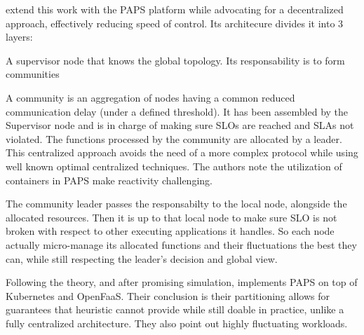 \documentclass[11pt]{sdm}
\begin{document}
\begin{description}
	\citet{baresi_paps_2019, baresi_paps_2021} extend this work with the \gls{PAPS} platform while advocating for a decentralized approach, effectively reducing speed of control.
	Its architecure divides it into 3 layers:
	\begin{enumerate*}
		\item A supervisor node that knows the global topology. Its responsability is to form communities
		\item A community is an aggregation of nodes having a common reduced communication delay (under a defined threshold). It has been assembled by the Supervisor node and is in charge of making sure \glspl{SLO} are reached and \glspl{SLA} not violated. The functions processed by the community are allocated by a leader. This centralized approach avoids the need of a more complex protocol while using well known optimal centralized techniques. The authors note the utilization of containers in \gls{PAPS} make reactivity challenging.
		\item The community leader passes the responsabilty to the local node, alongside the allocated resources. Then it is up to that local node to make sure \gls{SLO} is not broken with respect to other executing applications it handles. So each node actually micro-manage its allocated functions and their fluctuations the best they can, while still respecting the leader's decision and global view.
	\end{enumerate*}
	
	Following the theory, and after promising simulation, \citet{baresi_paps_2021} implements \gls{PAPS} on top of Kubernetes and OpenFaaS. Their conclusion is their partitioning allows for guarantees that heuristic cannot provide while still doable in practice, unlike a fully centralized architecture. They also point out highly fluctuating workloads.
	

\end{description}
\end{document}
